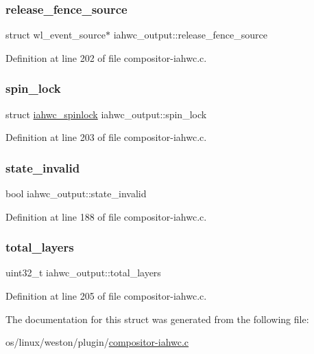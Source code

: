 \subsubsection{\texorpdfstring{release\+\_\+fence\+\_\+source}{release\_fence\_source}}
{\footnotesize\ttfamily struct wl\+\_\+event\+\_\+source$\ast$ iahwc\+\_\+output\+::release\+\_\+fence\+\_\+source}



Definition at line 202 of file compositor-\/iahwc.\+c.

\mbox{\label{structiahwc__output_a4ba268dca4916063188a7ba33f2123cd}} 
\subsubsection{\texorpdfstring{spin\+\_\+lock}{spin\_lock}}
{\footnotesize\ttfamily struct \mbox{\hyperlink{structiahwc__spinlock}{iahwc\+\_\+spinlock}} iahwc\+\_\+output\+::spin\+\_\+lock}



Definition at line 203 of file compositor-\/iahwc.\+c.

\mbox{\label{structiahwc__output_a87777ec8691b7e6422bb02a20742f45c}} 
\subsubsection{\texorpdfstring{state\+\_\+invalid}{state\_invalid}}
{\footnotesize\ttfamily bool iahwc\+\_\+output\+::state\+\_\+invalid}



Definition at line 188 of file compositor-\/iahwc.\+c.

\mbox{\label{structiahwc__output_a62bb8c46afae61d108af6c2f17cd6ff5}} 
\subsubsection{\texorpdfstring{total\+\_\+layers}{total\_layers}}
{\footnotesize\ttfamily uint32\+\_\+t iahwc\+\_\+output\+::total\+\_\+layers}



Definition at line 205 of file compositor-\/iahwc.\+c.



The documentation for this struct was generated from the following file\+:\begin{DoxyCompactItemize}
\item 
os/linux/weston/plugin/\mbox{\hyperlink{compositor-iahwc_8c}{compositor-\/iahwc.\+c}}\end{DoxyCompactItemize}

